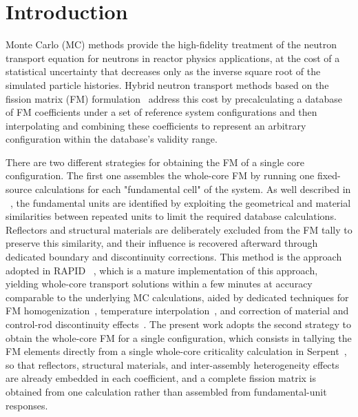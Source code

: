 \documentclass{style/nseJournal}
\begin{document}
\section{Introduction}
\label{sec:intro}
Monte Carlo (MC) methods provide the high-fidelity treatment of the neutron transport equation for neutrons in reactor physics applications, at the cost of a statistical uncertainty that decreases only as the inverse square root of the simulated particle histories. Hybrid neutron transport methods based on the fission matrix (FM) formulation~\cite{CarneyANE2014} address this cost by precalculating a database of FM coefficients under a set of reference system configurations and then interpolating and combining these coefficients to represent an arbitrary configuration within the database's validity range. 

There are two different strategies for obtaining the FM of a single core configuration. The first one assembles the whole-core FM by running one fixed-source calculations for each "fundamental cell" of the system. As well described in ~\cite{WaltersNSE2018}, the fundamental units are identified by exploiting the geometrical and material similarities between repeated units to limit the required database calculations. Reflectors and structural materials are deliberately excluded from the FM tally to preserve this similarity, and their influence is recovered afterward through dedicated boundary and discontinuity corrections. This method is the approach adopted in RAPID ~\cite{WaltersNSE2018}, which is a mature implementation of this approach, yielding whole-core transport solutions within a few minutes at accuracy comparable to the underlying MC calculations, aided by dedicated techniques for FM homogenization~\cite{HePNE2020Homog}, temperature interpolation~\cite{HeANE2020Temp}, and correction of material and control-rod discontinuity effects~\cite{HeANE2019,HePNE2020,Mascolino2022}.
The present work adopts the second strategy to obtain the whole-core FM for a single configuration, which consists in tallying the FM elements directly from a single whole-core criticality calculation in Serpent~\cite{LeppanenEPJN2025}, so that reflectors, structural materials, and inter-assembly heterogeneity effects are already embedded in each coefficient, and a complete fission matrix is obtained from one calculation rather than assembled from fundamental-unit responses.
\end{document}
